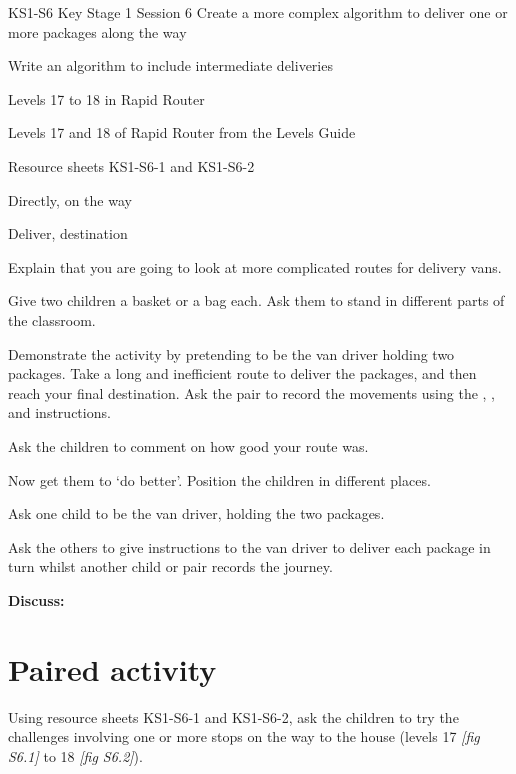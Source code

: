 \documentclass{../../../lessonplan}
\begin{document}
\lessonplantitle
    {KS1-S6}
    {Key Stage 1 Session 6}
    {Create a more complex algorithm to deliver one or more packages along the way}

\preamble
    {
    \item Write an algorithm to include intermediate deliveries 
    }
    {
    \item Levels 17 to 18 in Rapid Router
    \item Levels 17 and 18 of Rapid Router from the Levels Guide
    \item Resource sheets KS1-S6-1 and KS1-S6-2
    }
    {
    \item Directly, on the way
    \item Deliver, destination
    }

\begin{lessonplan}

Explain that you are going to look at more complicated routes for delivery vans.


Give two children a basket or a bag each.
Ask them to stand in different parts of the classroom.

Demonstrate the activity by pretending to be the van driver holding two packages.
Take a long and inefficient route to deliver the packages, and then reach your final destination.
Ask the pair to record the movements using the , , and  instructions.

Ask the children to comment on how good your route was.

Now get them to `do better'.
Position the children in different places.

Ask one child to be the van driver, holding the two packages.

Ask the others to give instructions to the van driver to deliver each package in turn whilst another child or pair records the journey.

\textbf{Discuss:} 

\section*{Paired activity}

Using resource sheets KS1-S6-1 and KS1-S6-2, ask the children to try the challenges involving one or more stops on the way to the house (levels 17 \textit{[fig S6.1]} to 18 \textit{[fig S6.2]}).


\end{lessonplan}
\end{document}
